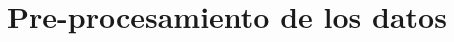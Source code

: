 \documentclass[../Main.tex]{subfiles}
\begin{document}
\section{Pre-procesamiento de los datos}
\end{document}
